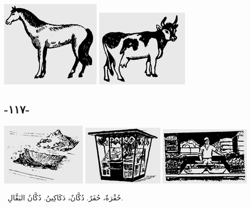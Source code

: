 \documentclass[a5paper]{article}
\begin{document}
 \includegraphics[width=1.8854in,height=1.6354in]{images/MuhammadBagauddinprettified-img334.png}   \includegraphics[width=1.75in,height=1.4583in]{images/MuhammadBagauddinprettified-img335.png} 

\subsection{-١١٧-}
 \includegraphics[width=1.6043in,height=1.1772in]{images/MuhammadBagauddinprettified-img336.png}   \includegraphics[width=1.5311in,height=1.1354in]{images/MuhammadBagauddinprettified-img337.png}   \includegraphics[width=1.7189in,height=1.1043in]{images/MuhammadBagauddinprettified-img338.png} 

\ حُفْرَةٌ، حُفَرٌ. دُكَّانٌ، دَكَاكِينُ. دُكَّانُ البَقَّالِ. 
\end{document}

